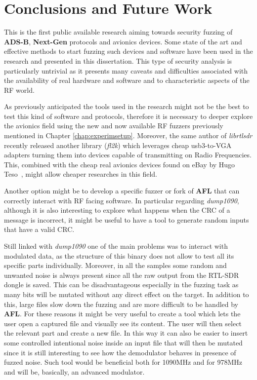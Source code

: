\documentclass[../main.tex]{subfiles}
\begin{document}
\chapter{Conclusions and Future Work}
\label{chap:futurework}

This is the first public available research aiming towards security fuzzing of \textbf{ADS-B}, \textbf{Next-Gen} protocols and avionics devices.
Some state of the art and effective methods to start fuzzing such devices and software have been used in the research and presented in this dissertation. This type of security analysis is particularly untrivial as it presents many caveats and difficulties associated with the availability of real hardware and software and to characteristic aspects of the RF world.

As previously anticipated the tools used in the research might not be the best to test this kind of software and protocols, therefore it is necessary to deeper explore the avionics field using the new and now available RF fuzzers previously mentioned in Chapter \ref{chap:experimsetup}. Moreover, the same author of \textit{librtlsdr} recently released another library (\textit{fl2k}\cite{fl2k}) which leverages cheap usb3-to-VGA adapters turning them into devices capable of transmitting on Radio Frequencies. This, combined with the cheap real avionics devices found on eBay by Hugo Teso~\cite{teso}, might allow cheaper researches in this field.

 Another option might be to develop a specific fuzzer or fork of \textbf{AFL} that can correctly interact with RF facing software. In particular regarding \textit{dump1090}, although it is also interesting to explore what happens when the CRC of a message is incorrect, it might be useful to have a tool to generate random inputs that have a valid CRC.

Still linked with \textit{dump1090} one of the main problems was to interact with modulated data, as the structure of this binary does not allow to test all its specific parts individually. Moreover, in all the samples some random and unwanted noise is always present since all the raw output from the RTL-SDR dongle is saved. This can be disadvantageous especially in the fuzzing task as many bits will be mutated without any direct effect on the target. In addition to this, large files slow down the fuzzing and are more difficult to be handled by \textbf{AFL}. For these reasons it might be very useful to create a tool which lets the user open a captured file and visually see its content. The user will then select the relevant part and create a new file. In this way it can also be easier to insert some controlled intentional noise inside an input file that will then be mutated since it is still interesting to see how the demodulator behaves in presence of fuzzed noise. Such tool would be beneficial both for 1090MHz and for 978MHz and will be, basically, an advanced modulator.
\end{document}
